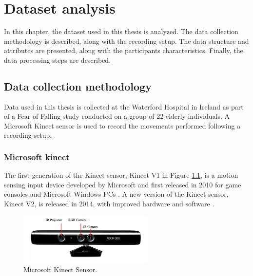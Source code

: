 \hypersetup{colorlinks=true, linkcolor=blue, citecolor=red}

\chapter{Dataset analysis} \label{chap:dataset_analysis}

    In this chapter, the dataset used in this thesis is analyzed. The data collection methodology is described, along with the recording setup. The data structure and attributes are presented, along with the participants characteristics. Finally, the data processing steps are described.

    \section{Data collection methodology}
        
        Data used in this thesis is collected at the Waterford Hospital in Ireland as part of a Fear of Falling study conducted on a group of 22 elderly individuals.  A Microsoft Kinect sensor is used to record the movements performed following a recording setup. 

        \subsection{Microsoft kinect}

                The first generation of the Kinect sensor, Kinect V1 in Figure \ref{fig:kinect_sensor}, is a motion sensing input device developed by Microsoft and first released in 2010 for game consoles and Microsoft Windows PCs \cite{xu_validity_2015}. A new version of the Kinect sensor, Kinect V2, is released in 2014, with improved hardware and software \cite{cruz_kinect_2012}. 

                \begin{figure}[H]
                    \centering
                    \includegraphics[width=0.6\textwidth]{./resources/images/kinect/kinect.png}
                    \caption{Microsoft Kinect Sensor.}
                    \label{fig:kinect_sensor}
                \end{figure}

